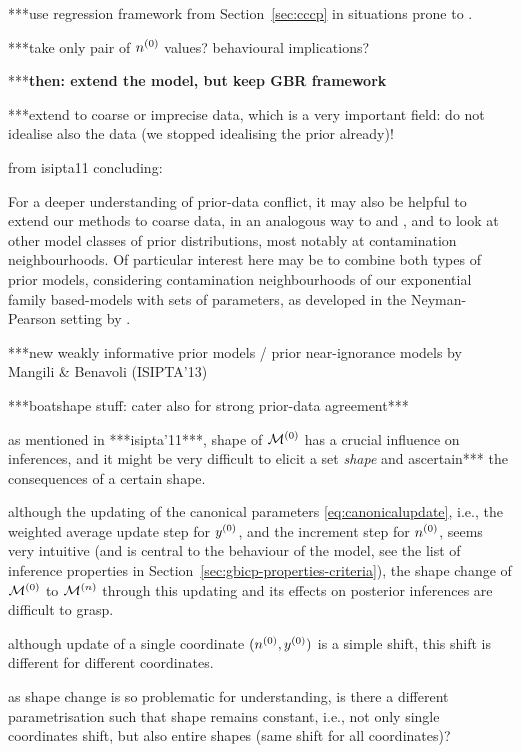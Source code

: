 ***use regression framework from Section~\ref{sec:cccp} in situations prone to \pdc.

***take only pair of $n^{(0)}$ values? behavioural implications?


***\textbf{then: extend the model, but keep GBR framework}

***extend to coarse or imprecise data, which is a very important field:
do not idealise also the data (we stopped idealising the prior already)!

from isipta11 concluding:
\begin{small}
For a deeper understanding of prior-data conflict, it may also be helpful
to extend our methods to coarse data, in an analogous way to \textcite{2007:utkinaugustin} and
\textcite{2009:Troffaes:Coolen}, and to look at other model classes of prior distributions, most
notably at contamination neighbourhoods. Of particular interest here may
be to combine both types of prior models, considering contamination
neighbourhoods of our exponential family based-models with sets of
parameters, as developed in the Neyman-Pearson setting by
\textcite[\S~5]{2002:augustin}.
\end{small}

***new weakly informative prior models / prior near-ignorance models by Mangili \& Benavoli (ISIPTA'13)


***boatshape stuff: cater also for strong prior-data agreement***

as mentioned in ***isipta'11***, shape of $\mathcal{M}^{(0)}$ has a crucial influence on inferences,
and it might be very difficult to elicit a set \emph{shape} and ascertain*** the consequences of a certain shape.

although the updating of the canonical parameters \eqref{eq:canonicalupdate},
i.e., the weighted average update step for $y^{(0)}$, and the increment step for $n^{(0)}$,
seems very intuitive (and is central to the behaviour of the model,
see the list of inference properties in Section~\ref{sec:gbicp-properties-criteria}),
the shape change of $\mathcal{M}^{(0)}$ to $\mathcal{M}^{(n)}$ through this updating and its effects on posterior inferences are difficult to grasp.

although update of a single coordinate $(n^{(0)},y^{(0)})$ is a simple shift,
this shift is different for different coordinates.

as shape change is so problematic for understanding,
is there a different parametrisation such that shape remains constant,
i.e., not only single coordinates shift, but also entire shapes
(same shift for all coordinates)?

